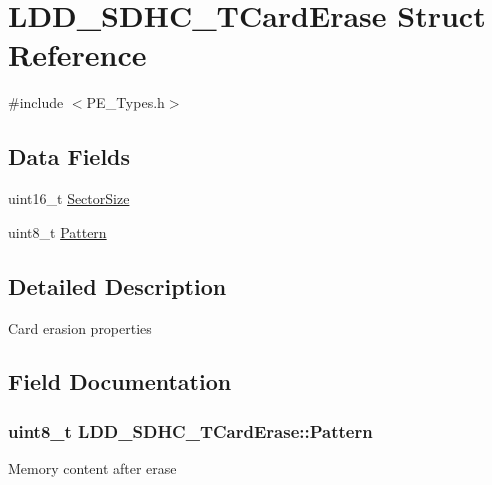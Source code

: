 \hypertarget{struct_l_d_d___s_d_h_c___t_card_erase}{}\section{L\+D\+D\+\_\+\+S\+D\+H\+C\+\_\+\+T\+Card\+Erase Struct Reference}
\label{struct_l_d_d___s_d_h_c___t_card_erase}


{\ttfamily \#include $<$P\+E\+\_\+\+Types.\+h$>$}

\subsection*{Data Fields}
\begin{DoxyCompactItemize}
\item 
uint16\+\_\+t \hyperlink{struct_l_d_d___s_d_h_c___t_card_erase_a3c0c33e89b65f4f6bfd6043585df5486}{Sector\+Size}
\item 
uint8\+\_\+t \hyperlink{struct_l_d_d___s_d_h_c___t_card_erase_a440e717a0c559282b7e277bf0872bee3}{Pattern}
\end{DoxyCompactItemize}


\subsection{Detailed Description}
Card erasion properties 

\subsection{Field Documentation}
\subsubsection[{\texorpdfstring{Pattern}{Pattern}}]{\setlength{\rightskip}{0pt plus 5cm}uint8\+\_\+t L\+D\+D\+\_\+\+S\+D\+H\+C\+\_\+\+T\+Card\+Erase\+::\+Pattern}\hypertarget{struct_l_d_d___s_d_h_c___t_card_erase_a440e717a0c559282b7e277bf0872bee3}{}\label{struct_l_d_d___s_d_h_c___t_card_erase_a440e717a0c559282b7e277bf0872bee3}
Memory content after erase 

